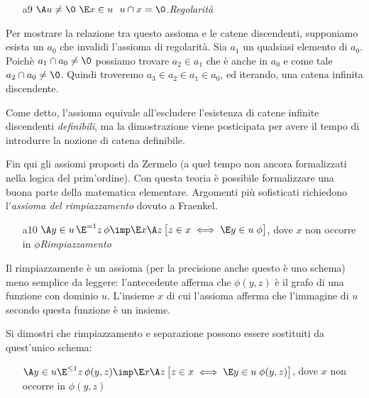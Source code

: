 \begin{itemize}
\item[a9]$\A u\neq\0\ \E x\in u\ \ u\cap x=\0$.\hfill\emph{Regolarit\`a} 
\end{itemize}

Per mostrare la relazione tra questo assioma e le catene discendenti, supponiamo esista un $a_0$ che invalidi l'assioma di regolarit\`a. Sia $a_1$ un qualsiasi elemento di $a_0$. Poich\`e $a_1\cap a_0\neq\0$ possiamo trovare $a_2\in a_1$ che \`e anche in $a_0$ e come tale $a_2\cap a_0\neq\0$. Quindi troveremo $a_3\in a_2\in a_1\in a_0$, ed iterando, una catena infinita discendente. 

Come detto, l'assioma  equivale all'escludere l'esistenza di catene infinite discendenti  \textit{definibili}, ma la dimostrazione viene posticipata per avere il tempo di introdurre la nozione di catena definibile.

Fin qui gli assiomi proposti da Zermelo (a quel tempo non ancora formalizzati nella logica del prim'ordine). Con questa teoria \`e possibile formalizzare una buona parte della matematica elementare. Argomenti pi\`u sofisticati richiedono l'\textit{assioma del rimpiazzamento\/} dovuto a Fraenkel. 


\begin{itemize}
\item[a10]$\A y\in u\,\E^{= 1} z\,\phi\imp\E x \A z\,\big[z\in x\iff \E y\in u\;\phi\big]$, dove $x$ non occorre in $\phi$\hfill\emph{Rimpiazzamento} 
\end{itemize}

Il rimpiazzamente \`e un assioma (per la precisione anche questo \`e uno schema) meno semplice da leggere: l'antecedente afferma che $\phi(y,z)$ \`e il grafo di una funzione con dominio $u$. L'insieme $x$ di cui l'assioma afferma che l'immagine di $u$ secondo questa funzione \`e un insieme. %

\begin{exercise}
Si dimostri che rimpiazzamento e separazione possono essere sostituiti da quest'unico schema:
\begin{itemize}
\item[]$\A y\in u\E^{\le 1} z\,\phi(y,z)\imp\E x \A z\,\big[z\in x\iff \E y\in u\;\phi(y,z)\big]$, dove $x$ non occorre in $\phi(y,z)$
\end{itemize}
\end{exercise}


